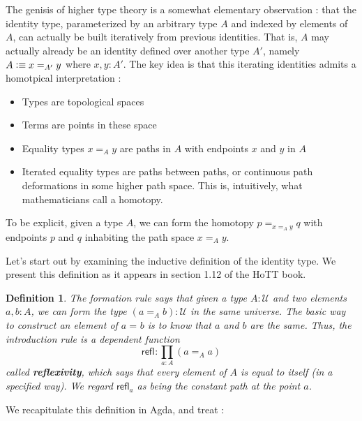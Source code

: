 \documentclass[11pt, a4paper]{article}
\newtheorem{definition}{Definition}
\newcommand{\refl}[1]{\ensuremath{\mathsf{refl}_{#1}}\xspace}
\newcommand{\define}[1]{\textbf{#1}}
\newcommand{\defeq}{\vcentcolon\equiv}  %
\newcommand{\id}[3][]{\ensuremath{#2 =_{#1} #3}\xspace}
\newcommand{\UU}{\ensuremath{\mathcal{U}}\xspace}
\begin{document}
The genisis of higher type theory is a somewhat elementary observation : that
the identity type, parameterized by an arbitrary type $A$ and indexed by
elements of $A$, can actually be built iteratively from previous identities.
That is, $A$ may actually already be an identity defined over another type
$A'$, namely $A \defeq x=_{A'} y$ where $x,y:A'$. The key idea is that this
iterating identities admits a homotpical interpretation : 

\begin{itemize}[noitemsep]

\item Types are topological spaces
\item Terms are points in these space

\item Equality types $x=_{A} y$ are paths in $A$ with endpoints $x$ and $y$ in
$A$

\item Iterated equality types are paths between paths, or continuous path
deformations in some higher path space. This is, intuitively, what
mathematicians call a homotopy.

\end{itemize}

To be explicit, given a type $A$, we can form the homotopy $p=_{x=_{A} y}q$
with endpoints $p$ and $q$ inhabiting the path space $x=_{A} y$.

Let's start out by examining the inductive definition of the identity type.  We
present this definition as it appears in section 1.12 of the HoTT book.

\begin{definition}
  The formation rule says that given a type $A:\UU$ and two elements $a,b:A$, we can form the type $(\id[A]{a}{b}):\UU$ in the same universe.
  The basic way to construct an element of $\id{a}{b}$ is to know that $a$ and $b$ are the same.
  Thus, the introduction rule is a dependent function
  \[\refl{} : \prod_{a:A} (\id[A]{a}{a}) \]
  called \define{reflexivity},
  which says that every element of $A$ is equal to itself (in a specified way).  We regard $\refl{a}$ as being the
  constant path %
  at the point $a$.
\end{definition}

We recapitulate this definition in Agda, and treat : 
\end{document}
